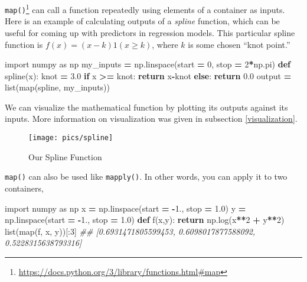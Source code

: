 \documentclass[
  12pt,
  krantz2]{krantz}
\makeatletter
\newenvironment{Shaded}{\begin{snugshade}}{\end{snugshade}}
\newcommand{\BuiltInTok}[1]{#1}
\newcommand{\CommentTok}[1]{\textcolor[rgb]{0.37,0.37,0.37}{\textit{#1}}}
\newcommand{\ControlFlowTok}[1]{\textcolor[rgb]{0.27,0.27,0.27}{\textbf{#1}}}
\newcommand{\DecValTok}[1]{\textcolor[rgb]{0.06,0.06,0.06}{#1}}
\newcommand{\FloatTok}[1]{\textcolor[rgb]{0.06,0.06,0.06}{#1}}
\newcommand{\ImportTok}[1]{#1}
\newcommand{\KeywordTok}[1]{\textcolor[rgb]{0.27,0.27,0.27}{\textbf{#1}}}
\newcommand{\NormalTok}[1]{#1}
\newcommand{\OperatorTok}[1]{\textcolor[rgb]{0.43,0.43,0.43}{\textbf{#1}}}
\renewcommand{\href}[2]{#2\footnote{\url{#1}}}
\newenvironment{kframe}{%
\medskip{}
\setlength{\fboxsep}{.8em}
 \def\at@end@of@kframe{}%
 \ifinner\ifhmode%
  \def\at@end@of@kframe{\end{minipage}}%
  \begin{minipage}{\columnwidth}%
 \fi\fi%
 \def\FrameCommand##1{\hskip\@totalleftmargin \hskip-\fboxsep
 \colorbox{shadecolor}{##1}\hskip-\fboxsep
     \hskip-\linewidth \hskip-\@totalleftmargin \hskip\columnwidth}%
 \MakeFramed {\advance\hsize-\width
   \@totalleftmargin\z@ \linewidth\hsize
   \@setminipage}}%
 {\par\unskip\endMakeFramed%
 \at@end@of@kframe}
\renewenvironment{Shaded}{\begin{kframe}}{\end{kframe}}
\makeatother
\begin{document}
\href{https://docs.python.org/3/library/functions.html\#map}{\texttt{map()}} can call a function repeatedly using elements of a container as inputs. Here is an example of calculating outputs of a \emph{spline} function, which can be useful for coming up with predictors in regression models. This particular spline function is \(f(x) = (x-k)1(x \ge k)\), where \(k\) is some chosen ``knot point.''

\begin{Shaded}
\begin{Highlighting}[]
\ImportTok{import}\NormalTok{ numpy }\ImportTok{as}\NormalTok{ np}
\NormalTok{my\_inputs }\OperatorTok{=}\NormalTok{ np.linspace(start }\OperatorTok{=} \DecValTok{0}\NormalTok{, stop }\OperatorTok{=} \DecValTok{2}\OperatorTok{*}\NormalTok{np.pi)}
\KeywordTok{def}\NormalTok{ spline(x):}
\NormalTok{    knot }\OperatorTok{=} \FloatTok{3.0}
    \ControlFlowTok{if}\NormalTok{ x }\OperatorTok{\textgreater{}=}\NormalTok{ knot:}
        \ControlFlowTok{return}\NormalTok{ x}\OperatorTok{{-}}\NormalTok{knot}
    \ControlFlowTok{else}\NormalTok{:}
        \ControlFlowTok{return} \FloatTok{0.0}
\NormalTok{output }\OperatorTok{=} \BuiltInTok{list}\NormalTok{(}\BuiltInTok{map}\NormalTok{(spline, my\_inputs))}
\end{Highlighting}
\end{Shaded}

We can visualize the mathematical function by plotting its outputs against its inputs. More information on visualization was given in subsection \ref{visualization}.

\begin{figure}

{\centering \texttt{[image: pics/spline]} 

}

\caption{Our Spline Function}\label{fig:spline-plot}
\end{figure}

\texttt{map()} can also be used like \texttt{mapply()}. In other words, you can apply it to two containers,

\begin{Shaded}
\begin{Highlighting}[]
\ImportTok{import}\NormalTok{ numpy }\ImportTok{as}\NormalTok{ np}
\NormalTok{x }\OperatorTok{=}\NormalTok{ np.linspace(start }\OperatorTok{=} \OperatorTok{{-}}\FloatTok{1.}\NormalTok{, stop }\OperatorTok{=} \FloatTok{1.0}\NormalTok{)}
\NormalTok{y }\OperatorTok{=}\NormalTok{ np.linspace(start }\OperatorTok{=} \OperatorTok{{-}}\FloatTok{1.}\NormalTok{, stop }\OperatorTok{=} \FloatTok{1.0}\NormalTok{)}
\KeywordTok{def}\NormalTok{ f(x,y):}
    \ControlFlowTok{return}\NormalTok{ np.log(x}\OperatorTok{**}\DecValTok{2} \OperatorTok{+}\NormalTok{ y}\OperatorTok{**}\DecValTok{2}\NormalTok{)}
\BuiltInTok{list}\NormalTok{(}\BuiltInTok{map}\NormalTok{(f, x, y))[:}\DecValTok{3}\NormalTok{]}
\CommentTok{\#\# [0.6931471805599453, 0.6098017877588092, 0.5228315638793316]}
\end{Highlighting}
\end{Shaded}
\end{document}
